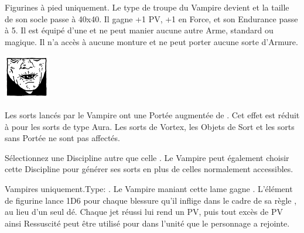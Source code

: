 \begin{multicols}{2}
 Figurines à pied uniquement. Le type de troupe du Vampire devient \monstrousinfantry{} et la taille de son socle passe à \unit{40x40}{\milli\meter}. Il gagne +1 PV, +1 en Force,  et son Endurance passe à 5. Il est équipé d'une \pw{} et ne peut manier aucune autre Arme, standard ou magique. Il n'a accès à aucune monture et ne peut porter aucune sorte d'Armure.

\endpricelist

\begin{center}\includegraphics[width=2cm]{logos/logo_nosferatu.png}\end{center}
\vspace*{-1.2cm}

\startpricelist

 Les sorts lancés par le Vampire ont une Portée augmentée de . Cet effet est réduit à  pour les sorts de type Aura. Les sorts de Vortex, les Objets de Sort et les sorts sans Portée ne sont pas affectés.

 Sélectionnez une Discipline \battle{} autre que celle \nature{}. Le Vampire peut également choisir cette Discipline pour générer ses sorts en plus de celles normalement accessibles.

\endpricelist

\end{multicols}

\closearmynewsection

\startarmymagicalitems

\armymagicalweapons

\startpricelist

 Vampires uniquement.\newline Type: \hw{}. Le Vampire maniant cette lame gagne . L'élément de figurine lance 1D6 pour chaque blessure qu'il inflige dans le cadre de sa règle \vampiric{}, au lieu d'un seul dé. Chaque jet \vampiric{} réussi lui rend un PV, puis tout excès de PV ainsi Ressuscité peut être utilisé pour \raisewounds{} dans l'unité que le personnage a rejointe.

